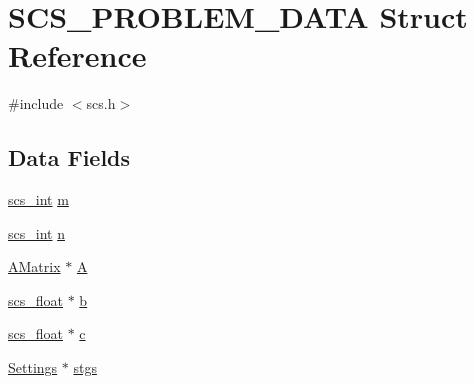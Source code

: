 \hypertarget{struct_s_c_s___p_r_o_b_l_e_m___d_a_t_a}{\section{S\-C\-S\-\_\-\-P\-R\-O\-B\-L\-E\-M\-\_\-\-D\-A\-T\-A Struct Reference}
\label{struct_s_c_s___p_r_o_b_l_e_m___d_a_t_a}
}


{\ttfamily \#include $<$scs.\-h$>$}

\subsection*{Data Fields}
\begin{DoxyCompactItemize}
\item 
\hyperlink{glbopts_8h_a23c48a83ce0c58783595ad45ffcaf76b}{scs\-\_\-int} \hyperlink{struct_s_c_s___p_r_o_b_l_e_m___d_a_t_a_af705db46a13e9b6ff5fa40ce45fccdda}{m}
\item 
\hyperlink{glbopts_8h_a23c48a83ce0c58783595ad45ffcaf76b}{scs\-\_\-int} \hyperlink{struct_s_c_s___p_r_o_b_l_e_m___d_a_t_a_a390ecc6e49d9983503a57fac9f7fb4d5}{n}
\item 
\hyperlink{lin_sys_8h_a324336b006180aa358ac994307a02ba2}{A\-Matrix} $\ast$ \hyperlink{struct_s_c_s___p_r_o_b_l_e_m___d_a_t_a_a79642822dc5c498cb976c12108ca878c}{A}
\item 
\hyperlink{glbopts_8h_ad37836e6404bb2c3ae8adcc6290699b9}{scs\-\_\-float} $\ast$ \hyperlink{struct_s_c_s___p_r_o_b_l_e_m___d_a_t_a_ad7476b7d39a30aadc8d10b923292c1da}{b}
\item 
\hyperlink{glbopts_8h_ad37836e6404bb2c3ae8adcc6290699b9}{scs\-\_\-float} $\ast$ \hyperlink{struct_s_c_s___p_r_o_b_l_e_m___d_a_t_a_a582b832e89512479c95de949ccdfd46f}{c}
\item 
\hyperlink{glbopts_8h_a6ef430ee595f717434ba4b1e27d102d8}{Settings} $\ast$ \hyperlink{struct_s_c_s___p_r_o_b_l_e_m___d_a_t_a_a14bfc0a349fe9be30059e55c4ba0066f}{stgs}
\end{DoxyCompactItemize}


